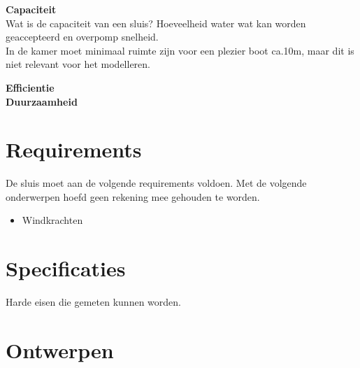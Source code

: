 \documentclass{article}
\begin{document}
\textbf{Capaciteit}\\
Wat is de capaciteit van een sluis? Hoeveelheid water wat kan worden geaccepteerd en overpomp snelheid.\\
In de kamer moet minimaal ruimte zijn voor een plezier boot ca.10m, maar dit is niet relevant voor het modelleren.

\vskip0.5cm

\vskip0.5cm

\textbf{Efficientie}\\

\textbf{Duurzaamheid}\\
\section{Requirements} %
De sluis moet aan de volgende requirements voldoen.
\vskip0.5cm
Met de volgende onderwerpen hoefd geen rekening mee gehouden te worden.
\begin{itemize}
\item Windkrachten
\end{itemize}

\section{Specificaties} %
Harde eisen die gemeten kunnen worden.

\section{Ontwerpen} %
\end{document}
